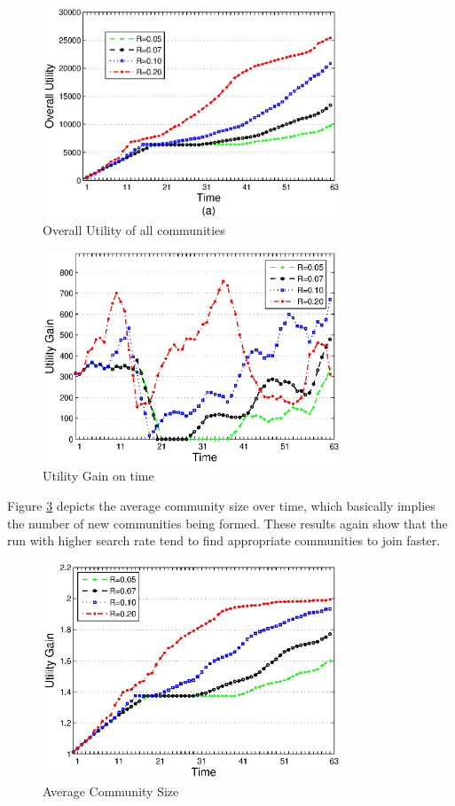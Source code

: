 \documentclass[10pt,journal,cspaper,compsoc]{IEEEtran}
\begin{document}
\begin{figure}%
\centering
\includegraphics[width=3.5in]{figures/stats1.eps}
\caption{Overall Utility of all communities}
\label{stats1}
\end{figure}


\begin{figure}%
\centering
\includegraphics[width=3.5in]{figures/stats2.eps}
\caption{Utility Gain on time}
\label{stats2}
\end{figure}

Figure \ref{stats3} depicts the average community size over time, which basically implies the number of new communities being formed. These results again show that the run with higher search rate tend to find appropriate communities to join faster.

\begin{figure}%
\centering
\includegraphics[width=3.5in]{figures/stats3.eps}
\caption{Average Community Size}
\label{stats3}
\end{figure}
\end{document}
